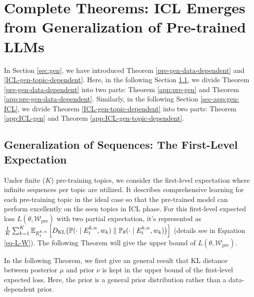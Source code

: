 \section{Complete Theorems: ICL Emerges from Generalization of Pre-trained LLMs}\label{sec-app:gen}
In Section \ref{sec:gen}, we have introduced Theorem \ref{pre-gen-data-dependent} and \ref{ICL-gen-topic-dependent}. Here, in the following Section \ref{sec-app:gen-pre}, we divide Theorem \ref{pre-gen-data-dependent} into two parts: Theorem \ref{app:pre-gen} and Theorem \ref{app:pre-gen-data-dependent}. Similarly, in the following Section \ref{sec-app:gen-ICL}, we divide Theorem \ref{ICL-gen-topic-dependent} into two parts: Theorem \ref{app:ICL-gen} and Theorem \ref{app:ICL-gen-topic-dependent}.

\subsection{Generalization of Sequences: The First-Level Expectation}\label{sec-app:gen-pre}
Under finite ($K$) pre-training topics, we consider the first-level expectation where infinite sequences per topic are utilized. It describes comprehensive learning for each pre-training topic in the ideal case so that the pre-trained model can perform excellently on the seen topics in ICL phase. For this first-level expected loss $L(\theta, \mathcal{W}_{\text{pre}})$ with two partial expectation, it's represented as $\frac{1}{K}\sum_{k=1}^K\mathbb{E}_{E^{k,n}_t}\left[D_{\mathrm{KL}}\big(\mathbb{P}(\cdot\mid E^{k,n}_t,w_k) \parallel \mathbb{P}_\theta(\cdot\mid E^{k,n}_t,w_k)\big)\right]$ (details see in Equation \ref{eq-L-W}). The following Theorem will give the upper bound of $L(\theta, \mathcal{W}_{\text{pre}})$.

In the following Theorem, we first give an general result that KL distance between posterior $\mu$ and prior $\nu$ is kept in the upper bound of the first-level expected loss. Here, the prior is a general prior distribution rather than a data-dependent prior.

